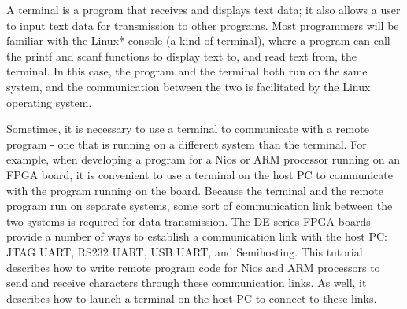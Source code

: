 \documentclass[11pt, twoside, pdftex]{article}
\begin{document}
A terminal is a program that receives and displays text data; it also allows a user to input text data for transmission to other programs.
Most programmers will be familiar with the Linux* console (a kind of terminal), where a program can call the printf and scanf functions to display text to, and read text from, the terminal. In this case, the program and the terminal both run on the same system, and the communication between the two is facilitated by the Linux operating system. 



Sometimes, it is necessary to use a terminal to communicate with a remote program - one that is running on a different system than the terminal. For example, when developing a program for a Nios or ARM processor running on an FPGA board, it is convenient to use a terminal on the host PC to communicate with the program running on the board. Because the terminal and the remote program run on separate systems, some sort of communication link between the two systems is required for data transmission. The DE-series FPGA boards provide a number of ways to establish a communication link with the host PC: JTAG UART, RS232 UART, USB UART, and Semihosting. This tutorial describes how to write remote program code for Nios and ARM processors to send and receive characters through these communication links. As well, it describes how to launch a terminal on the host PC to connect to these links.
\end{document}
